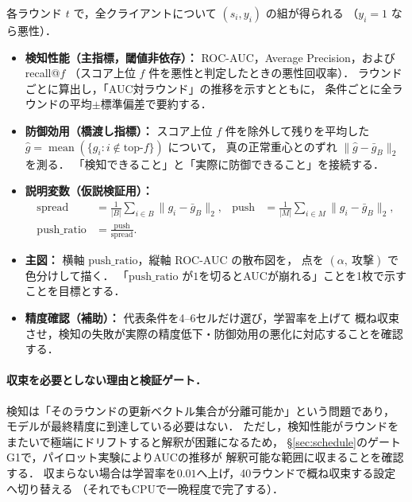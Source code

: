 \documentclass[a4j, dvipdfmx]{jsarticle}  %
\begin{document}
各ラウンド $t$ で，全クライアントについて $(s_i, y_i)$ の組が得られる
（$y_i = 1$ なら悪性）．

\begin{itemize}
  \item \textbf{検知性能（主指標，閾値非依存）：}
        ROC-AUC，Average Precision，および recall@$f$
        （スコア上位 $f$ 件を悪性と判定したときの悪性回収率）．
        ラウンドごとに算出し，「AUC対ラウンド」の推移を示すとともに，
        条件ごとに全ラウンドの平均$\pm$標準偏差で要約する．
  \item \textbf{防御効用（橋渡し指標）：}
        スコア上位 $f$ 件を除外して残りを平均した
        $\hat{g} = \operatorname{mean}(\{g_i : i \notin \text{top-}f\})$ について，
        真の正常重心とのずれ $\|\hat{g} - \bar{g}_B\|_2$ を測る．
        「検知できること」と「実際に防御できること」を接続する．
  \item \textbf{説明変数（仮説検証用）：}
        \begin{align}
          \mathrm{spread} &= \frac{1}{|B|}\sum_{i \in B}\|g_i - \bar{g}_B\|_2, &
          \mathrm{push}    &= \frac{1}{|M|}\sum_{i \in M}\|g_i - \bar{g}_B\|_2, \\
          \mathrm{push\_ratio} &= \frac{\mathrm{push}}{\mathrm{spread}}. & &
        \end{align}
  \item \textbf{主図：} 横軸 $\mathrm{push\_ratio}$，縦軸 ROC-AUC の散布図を，
        点を $(\alpha,\ \text{攻撃})$ で色分けして描く．
        「$\mathrm{push\_ratio}$ が$1$を切るとAUCが崩れる」ことを1枚で示すことを目標とする．
  \item \textbf{精度確認（補助）：} 代表条件を4--6セルだけ選び，学習率を上げて
        概ね収束させ，検知の失敗が実際の精度低下・防御効用の悪化に対応することを確認する．
\end{itemize}

\paragraph{収束を必要としない理由と検証ゲート．}
検知は「そのラウンドの更新ベクトル集合が分離可能か」という問題であり，
モデルが最終精度に到達している必要はない．
ただし，検知性能がラウンドをまたいで極端にドリフトすると解釈が困難になるため，
\S\ref{sec:schedule}のゲートG1で，パイロット実験によりAUCの推移が
解釈可能な範囲に収まることを確認する．
収まらない場合は学習率を$0.01$へ上げ，40ラウンドで概ね収束する設定へ切り替える
（それでもCPUで一晩程度で完了する）．
\end{document}
